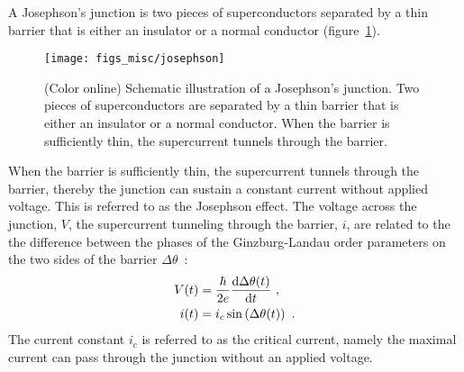 A Josephson's junction is two pieces of superconductors separated by a thin barrier that is either an insulator or a normal conductor (figure~\ref{fig:josephson}). %
\begin{figure}[ht]%
	\centering%
    \texttt{[image: figs\_misc/josephson]}%
    \caption[Josephson's junction]{\label{fig:josephson}(Color online) Schematic illustration of a Josephson's junction. Two pieces of superconductors are separated by a thin barrier that is either an insulator or a normal conductor. When the barrier is sufficiently thin, the supercurrent tunnels through the barrier.}%
\end{figure}%
%
When the barrier is sufficiently thin, the supercurrent tunnels through the barrier, thereby the junction can sustain a constant current without applied voltage. This is referred to as the Josephson effect. The voltage across the junction, $V$, the supercurrent tunneling through the barrier, $i$, are related to the the difference between the phases of the Ginzburg-Landau order parameters on the two sides of the barrier $\Delta\theta$~\cite{Josephson1962, Josephson1974}:%
\begin{align}
    V(t) &= \frac{\hbar}{2e}\frac{\mathop{}\!\mathrm{d} \Delta\theta(t)}{\mathop{}\!\mathrm{d} t}~,\\
    i(t) &= i_c\sin\left(\Delta\theta(t)\right)~.\label{eq:Josephson_I}
\end{align}%
The current constant $i_c$ is referred to as the critical current, namely the maximal current can pass through the junction without an applied voltage.

